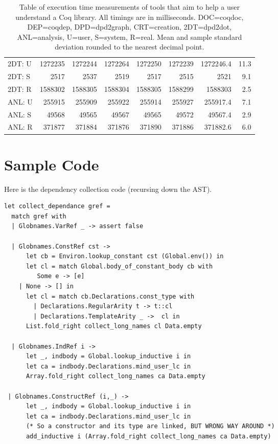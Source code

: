 \begin{table}[h]
\begin{tabular*}{\textwidth}{@{\extracolsep{\fill}} lrrrrrrr}
    2DT: U & 1272235 & 1272244 & 1272264 & 1272250 & 1272239 & 1272246.4 & 11.3 \\
    2DT: S & 2517    & 2537    & 2519    & 2517    & 2515    & 2521      & 9.1 \\
    2DT: R & 1588302 & 1588305 & 1588304 & 1588305 & 1588299 & 1588303   & 2.5 \\

    ANL: U & 255915  & 255909  & 255922  & 255914  & 255927  & 255917.4  & 7.1 \\
    ANL: S & 49568   & 49565   & 49567   & 49565   & 49572   & 49567.4   & 2.9 \\
    ANL: R & 371877  & 371884  & 371876  & 371890  & 371886  & 371882.6  & 6.0 \\

    \bottomrule

  \end{tabular*}
  \normalsize

  \bigskip 

  \caption{Table of execution time measurements of tools that aim to help a
    user understand a Coq library. All timings are in milliseconds. DOC=coqdoc,
    DEP=coqdep, DPD=dpd2graph, CRT=creation, 2DT=dpd2dot, ANL=analysis, U=user,
    S=system, R=real. Mean and sample standard deviation rounded to the nearest
    decimal point.}

\end{table}

\chapter{Sample Code}\label{chapter:sample}

Here is the dependency collection code (recursing down the AST).

\begin{verbatim}
let collect_dependance gref =
  match gref with
  | Globnames.VarRef _ -> assert false

  | Globnames.ConstRef cst ->
      let cb = Environ.lookup_constant cst (Global.env()) in
      let cl = match Global.body_of_constant_body cb with
         Some e -> [e]
	| None -> [] in
      let cl = match cb.Declarations.const_type with
        | Declarations.RegularArity t -> t::cl
        | Declarations.TemplateArity _ ->  cl in
      List.fold_right collect_long_names cl Data.empty

  | Globnames.IndRef i ->
      let _, indbody = Global.lookup_inductive i in
      let ca = indbody.Declarations.mind_user_lc in
      Array.fold_right collect_long_names ca Data.empty

 | Globnames.ConstructRef (i,_) -> 
      let _, indbody = Global.lookup_inductive i in
      let ca = indbody.Declarations.mind_user_lc in
      (* So a constructor and its type are linked, BUT WRONG WAY AROUND *)
      add_inductive i (Array.fold_right collect_long_names ca Data.empty)
\end{verbatim}


